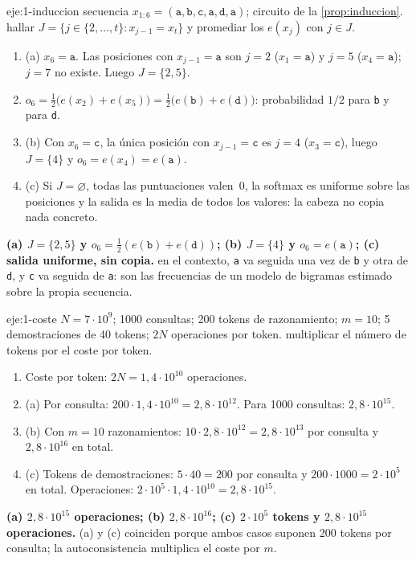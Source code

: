 \begin{solucion}{eje:1-induccion}
\datos secuencia $x_{1:6}=(\texttt{a},\texttt{b},\texttt{c},\texttt{a},\texttt{d},\texttt{a})$; circuito de la \cref{prop:induccion}.
\planteamiento hallar $J=\{j\in\{2,\dots,t\}:x_{j-1}=x_t\}$ y promediar los $e(x_j)$ con $j\in J$.
\pasos
\begin{enumerate}[label=\arabic*.]
  \item (a) $x_6=\texttt{a}$. Las posiciones con $x_{j-1}=\texttt{a}$ son $j=2$ ($x_1=\texttt{a}$) y $j=5$ ($x_4=\texttt{a}$); $j=7$ no existe. Luego $J=\{2,5\}$.
  \item $o_6=\tfrac12\bigl(e(x_2)+e(x_5)\bigr)=\tfrac12\bigl(e(\texttt{b})+e(\texttt{d})\bigr)$: probabilidad $1/2$ para \texttt{b} y para \texttt{d}.
  \item (b) Con $x_6=\texttt{c}$, la única posición con $x_{j-1}=\texttt{c}$ es $j=4$ ($x_3=\texttt{c}$), luego $J=\{4\}$ y $o_6=e(x_4)=e(\texttt{a})$.
  \item (c) Si $J=\varnothing$, todas las puntuaciones valen~0, la softmax es uniforme sobre las posiciones y la salida es la media de todos los valores: la cabeza no copia nada concreto.
\end{enumerate}
\resultado \textbf{(a) $J=\{2,5\}$ y $o_6=\frac12(e(\texttt{b})+e(\texttt{d}))$; (b) $J=\{4\}$ y $o_6=e(\texttt{a})$; (c) salida uniforme, sin copia.}
\comprobacion en el contexto, \texttt{a} va seguida una vez de \texttt{b} y otra de \texttt{d}, y \texttt{c} va seguida de \texttt{a}: son las frecuencias de un modelo de bigramas estimado sobre la propia secuencia.
\end{solucion}

\begin{solucion}{eje:1-coste}
\datos $N=7\cdot 10^{9}$; 1000 consultas; 200 tokens de razonamiento; $m=10$; 5 demostraciones de 40 tokens; $2N$ operaciones por token.
\planteamiento multiplicar el número de tokens por el coste por token.
\pasos
\begin{enumerate}[label=\arabic*.]
  \item Coste por token: $2N=1{,}4\cdot 10^{10}$ operaciones.
  \item (a) Por consulta: $200\cdot 1{,}4\cdot 10^{10}=2{,}8\cdot 10^{12}$. Para 1000 consultas: $2{,}8\cdot 10^{15}$.
  \item (b) Con $m=10$ razonamientos: $10\cdot 2{,}8\cdot 10^{12}=2{,}8\cdot 10^{13}$ por consulta y $2{,}8\cdot 10^{16}$ en total.
  \item (c) Tokens de demostraciones: $5\cdot 40=200$ por consulta y $200\cdot 1000=2\cdot 10^{5}$ en total. Operaciones: $2\cdot 10^{5}\cdot 1{,}4\cdot 10^{10}=2{,}8\cdot 10^{15}$.
\end{enumerate}
\resultado \textbf{(a) $2{,}8\cdot 10^{15}$ operaciones; (b) $2{,}8\cdot 10^{16}$; (c) $2\cdot 10^{5}$ tokens y $2{,}8\cdot 10^{15}$ operaciones.}
\comprobacion (a) y (c) coinciden porque ambos casos suponen 200 tokens por consulta; la autoconsistencia multiplica el coste por $m$.
\end{solucion}

